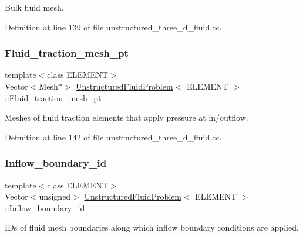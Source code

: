 Bulk fluid mesh. 



Definition at line 139 of file unstructured\+\_\+three\+\_\+d\+\_\+fluid.\+cc.

\mbox{\label{classUnstructuredFluidProblem_ad2fd96c077dbc69077daaf20a314896c}} 
\subsubsection{\texorpdfstring{Fluid\+\_\+traction\+\_\+mesh\+\_\+pt}{Fluid\_traction\_mesh\_pt}}
{\footnotesize\ttfamily template$<$class E\+L\+E\+M\+E\+NT$>$ \\
Vector$<$Mesh$\ast$$>$ \hyperlink{classUnstructuredFluidProblem}{Unstructured\+Fluid\+Problem}$<$ E\+L\+E\+M\+E\+NT $>$\+::Fluid\+\_\+traction\+\_\+mesh\+\_\+pt}



Meshes of fluid traction elements that apply pressure at in/outflow. 



Definition at line 142 of file unstructured\+\_\+three\+\_\+d\+\_\+fluid.\+cc.

\mbox{\label{classUnstructuredFluidProblem_a2923e009bcea7cdbdd7ea5788580a3f8}} 
\subsubsection{\texorpdfstring{Inflow\+\_\+boundary\+\_\+id}{Inflow\_boundary\_id}}
{\footnotesize\ttfamily template$<$class E\+L\+E\+M\+E\+NT$>$ \\
Vector$<$unsigned$>$ \hyperlink{classUnstructuredFluidProblem}{Unstructured\+Fluid\+Problem}$<$ E\+L\+E\+M\+E\+NT $>$\+::Inflow\+\_\+boundary\+\_\+id}



I\+Ds of fluid mesh boundaries along which inflow boundary conditions are applied. 



